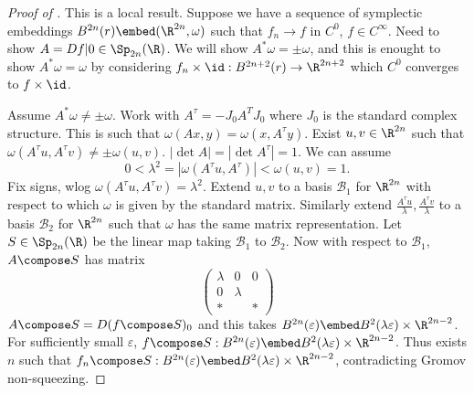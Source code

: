 \documentclass[a4paper]{article}
\begin{document}
\begin{proof}[Proof of ]
  This is a local result. Suppose we have a sequence of symplectic embeddings \(B^{2n}(r) \embed (\R^{2n}, \omega)\) such that \(f_n \to f\) in \(C^0\), \(f \in C^\infty\). Need to show \(A = Df|0 \in \Sp_{2n}(\R)\). We will show \(A^*\omega = \pm \omega\), and this is enought to show \(A^*\omega = \omega\) by considering \(f_n \times \id: B^{2n + 2}(r) \to \R^{2n + 2}\) which \(C^0\) converges to \(f \times \id\).

  Assume \(A^*\omega \ne \pm \omega\). Work with \(A^\tau = -J_0 A^T J_0\) where \(J_0\) is the standard complex structure. This is such that \(\omega(Ax, y) = \omega(x, A^\tau y)\). Exist \(u, v \in \R^{2n}\) such that \(\omega(A^\tau u, A^\tau v) \ne \pm \omega(u, v)\). \(|\det A| = |\det A^\tau| = 1\). We can assume
  \[
    0 < \lambda^2 = |\omega(A^\tau u, A^\tau)| < \omega(u, v) = 1.
  \]
  Fix signs, wlog \(\omega(A^\tau u, A^\tau v) = \lambda^2\). Extend \(u, v\) to a basis \(\mathcal B_1\) for \(\R^{2n}\) with respect to which \(\omega\) is given by the standard matrix. Similarly extend \(\frac{A^\tau u}{\lambda}, \frac{A^\tau v}{\lambda}\) to a basis \(\mathcal B_2\) for \(\R^{2n}\) such that \(\omega\) has the same matrix representation. Let \(S \in \Sp_{2n}(\R)\) be the linear map taking \(\mathcal B_1\) to \(\mathcal B_2\). Now with respect to \(\mathcal B_1\), \(A \compose S\) has matrix
  \[
    \begin{pmatrix}
      \lambda & 0 & 0 \\
      0 & \lambda \\
      * & & *
    \end{pmatrix}
  \]
  \(A \compose S = D(f \compose S)_0\) and this takes \(B^{2n}(\varepsilon) \embed B^2(\lambda \varepsilon) \times \R^{2n - 2}\). For sufficiently small \(\varepsilon\), \(f \compose S: B^{2n}(\varepsilon) \embed B^2(\lambda \varepsilon) \times \R^{2n - 2}\). Thus exists \(n\) such that \(f_n \compose S: B^{2n}(\varepsilon) \embed B^2(\lambda \varepsilon) \times \R^{2n - 2}\), contradicting Gromov non-squeezing.
\end{proof}



\printindex
\end{document}
